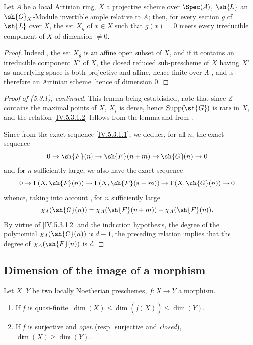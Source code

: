 \begin{lemma}[5.3.1.3]
\label{IV.5.3.1.3}
Let $A$ be a local Artinian ring, $X$ a projective scheme over $\Spec(A)$, $\sh{L}$ an $\sh{O}_X$-Module invertible ample relative to $A$; then, for every section $g$ of $\sh{L}$ over $X$, the set $X_g$ of $x\in X$ such that $g(x)=0$ meets every irreducible component of $X$ of dimension $\neq 0$.
\end{lemma}

\begin{proof}
Indeed , the set $X_g$ is an affine open subset of $X$, and if it contains an irreducible component $X'$ of $X$, the closed reduced sub-prescheme of $X$ having $X'$ as underlying space is both projective and affine, hence finite over $A$ , and is therefore an Artinian scheme, hence of dimension $0$.
\end{proof}

\begin{proof}[Proof of \emph{(5.3.1)}, continued]
This lemma being established, note that since $Z$ contains the maximal points of $X$, $X_f$ is dense, hence $\operatorname{Supp}(\sh{G})$ is rare in $X$, and the relation \eqref{IV.5.3.1.2} follows from the lemma and from .

Since from the exact sequence \eqref{IV.5.3.1.1}, we deduce, for all $n$, the exact sequence
\[
  0\to\sh{F}(n)\to\sh{F}(n+m)\to\sh{G}(n)\to 0
\]
and for $n$ sufficiently large, we also have the exact sequence 
\[
  0\to\Gamma(X,\sh{F}(n))\to\Gamma(X,\sh{F}(n+m))\to\Gamma(X,\sh{G}(n))\to 0
\]
whence, taking into account , for $n$ sufficiently large,
\[
  \chi_A(\sh{G}(n)) = \chi_A(\sh{F}(n+m)) - \chi_A(\sh{F}(n)).
\]
By virtue of \eqref{IV.5.3.1.2} and the induction hypothesis, the degree of the polynomial $\chi_A(\sh{G}(n))$ is $d-1$, the preceding relation implies that the degree of $\chi_A(\sh{F}(n))$ is $d$.
\end{proof}

\subsection{Dimension of the image of a morphism}
\label{subsection:IV.5.4}

\begin{proposition}[5.4.1]
\label{IV.5.4.1}
Let $X$, $Y$ be two locally Noetherian preschemes, $f:X\to Y$ a morphism.
\begin{enumerate}[label=(\roman*)]
  \item If $f$ is quasi-finite, $\dim(X)\leq\dim(\overline{f(X)})\leq\dim(Y)$.
  \item If $f$ is surjective and \emph{open} (resp.\ surjective and \emph{closed}), $\dim(X)\geq\dim(Y)$.
\end{enumerate}
\end{proposition}

